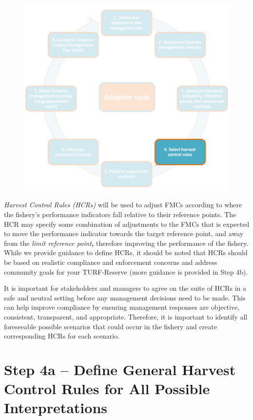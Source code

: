 \documentclass[]{book}
\begin{document}
\begin{figure}
\centering
\includegraphics{myMediaFolder/media/Step4.png}
\caption{}
\end{figure}

\emph{Harvest Control Rules (HCRs)} will be used to adjust FMCs
according to where the fishery's performance indicators fall relative to
their reference points. The HCR may specify some combination of
adjustments to the FMCs that is expected to move the performance
indicator towards the target reference point, and away from the
\emph{limit reference point}\textbf{,} therefore improving the
performance of the fishery. While we provide guidance to define HCRs, it
should be noted that HCRs should be based on realistic compliance and
enforcement concerns and address community goals for your TURF-Reserve
(more guidance is provided in Step 4b).

It is important for stakeholders and managers to agree on the suite of
HCRs in a safe and neutral setting before any management decisions need
to be made. This can help improve compliance by ensuring management
responses are objective, consistent, transparent, and appropriate.
Therefore, it is important to identify all foreseeable possible
scenarios that could occur in the fishery and create corresponding HCRs
for each scenario.

\section{Step 4a -- Define General Harvest Control Rules for All
Possible
Interpretations}\label{step-4a-define-general-harvest-control-rules-for-all-possible-interpretations}
\end{document}

